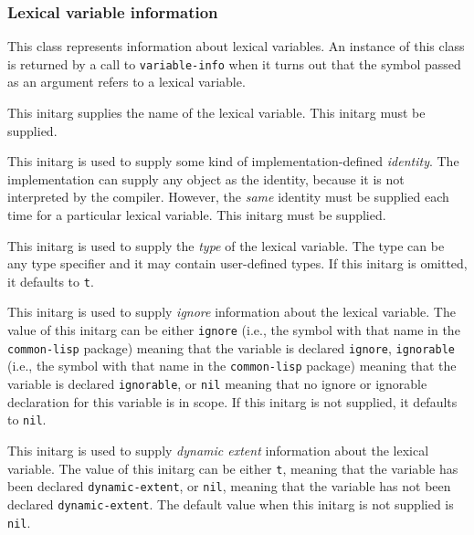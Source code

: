 \subsubsection{Lexical variable information}


This class represents information about lexical variables.  An
instance of this class is returned by a call to \texttt{variable-info}
when it turns out that the symbol passed as an argument refers to a
lexical variable.


This initarg supplies the name of the lexical variable.  This initarg
must be supplied. 


This initarg is used to supply some kind of implementation-defined 
\emph{identity}.  The implementation can supply any object as the
identity, because it is not interpreted by the compiler.  However, the
\emph{same} identity must be supplied each time for a particular
lexical variable.  This initarg must be supplied. 


This initarg is used to supply the \emph{type} of the lexical
variable.  The type can be any type specifier and it may contain
user-defined types.  If this initarg is omitted, it defaults to
\texttt{t}. 


This initarg is used to supply \emph{ignore} information about the
lexical variable.  The value of this initarg can be either
\texttt{ignore} (i.e., the symbol with that name in the
\texttt{common-lisp} package) meaning that the variable is declared
\texttt{ignore}, \texttt{ignorable} (i.e., the symbol with that name
in the \texttt{common-lisp} package) meaning that the variable is
declared \texttt{ignorable}, or \texttt{nil} meaning that no ignore or
ignorable declaration for this variable is in scope.  If this initarg
is not supplied, it defaults to \texttt{nil}.


This initarg is used to supply \emph{dynamic extent} information about
the lexical variable.  The value of this initarg can be either
\texttt{t}, meaning that the variable has been declared
\texttt{dynamic-extent}, or \texttt{nil}, meaning that the variable
has not been declared \texttt{dynamic-extent}.  The default value when
this initarg is not supplied is \texttt{nil}. 

